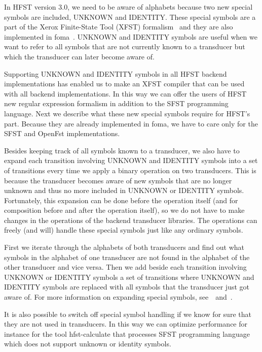 \documentclass{llncs}
\begin{document}
In HFST version 3.0, we need to be aware of alphabets because two new
special symbols are included, UNKNOWN and IDENTITY. These special
symbols are a part of the Xerox Finite-State Tool (XFST) 
formalism~\cite[page x]{beesley/2003} and they are also implemented in
foma~\cite{hulden/2009}. UNKNOWN and IDENTITY symbols are useful
when we want to refer to all symbols that are not currently known to a
transducer but which the transducer can later become aware of. 

Supporting UNKNOWN and IDENTITY symbols in all HFST backend
implementations has enabled us to make an XFST compiler that can be used
with all backend implementations. 
In this way we can offer the users of HFST new regular expression
formalism in addition to the SFST programming language. Next we
describe what these new special symbols require for HFST's
part. Because they are already implemented in foma, we have to care
only for the SFST and OpenFst implementations.

Besides keeping track of all symbols known to a transducer, we also
have to expand each transition involving UNKNOWN and IDENTITY symbols
into a set of transitions every time we apply a binary operation on
two transducers. 
This is because the transducer becomes aware of new symbols that are
no longer unknown and thus no more included in UNKNOWN or IDENTITY
symbols.
Fortunately, this expansion can be done before the operation itself 
(and for composition before and after the operation itself), so we do
not have to make changes in the operations of the backend transducer
libraries. 
The operations can freely (and will) handle these special symbols just
like any ordinary symbols. 

First we iterate through the alphabets of both transducers and find
out what symbols in the alphabet of one transducer are not found in
the alphabet of the other transducer and vice versa. 
Then we add beside each transition involving UNKNOWN or IDENTITY
symbols a set of transitions where UNKNOWN and IDENTITY symbols are
replaced with all symbols that the transducer just got aware of. 
For more information on expanding special symbols, 
see~\cite{hulden/2009}~and~\cite{beesley/2003}.

It is also possible to switch off special symbol handling if we know
for sure that they are not used in transducers. 
In this way we can optimize performance for instance for the tool 
hfst-calculate that processes SFST programming language which does not
support unknown or identity symbols.
\end{document}

